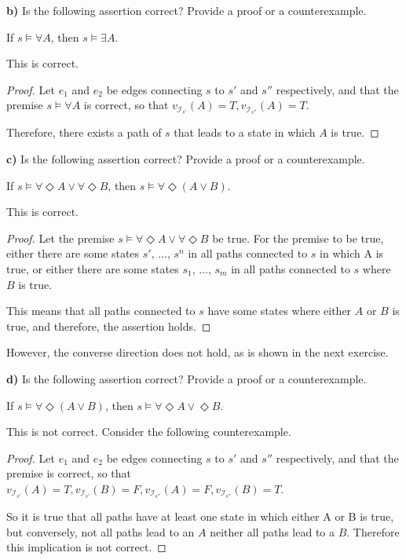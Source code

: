 \documentclass[titlepage, letterpaper, fleqn]{article}
\newcommand{\spacepls}{\vspace{5mm}}
\begin{document}
{\large \textbf{b)} Is the following assertion correct? Provide a proof or a counterexample.

If \(s \models \forall A\), then \(s \models \exists A\).}

\spacepls

This is correct.

\begin{proof}
Let \(e_1\) and \(e_2\) be edges connecting \(s\) to \(s'\) and \(s''\) respectively, and that the premise \(s \models \forall A\) is correct, so that \(v_{\mathscr{I}_{s'}}(A) = T, v_{\mathscr{I}_{s''}}(A) = T\).

Therefore, there exists a path of \(s\) that leads to a state in which \(A\) is true.
\end{proof}

\pagebreak

{\large \textbf{c)} Is the following assertion correct? Provide a proof or a counterexample.

If \(s \models \forall \Diamond A \vee \forall \Diamond B\), then \(s \models \forall \Diamond (A \vee B)\).}

\spacepls

This is correct.

\begin{proof}
Let  the premise \(s \models \forall \Diamond A \vee \forall \Diamond B\) be true. For the premise to be true, either there are some states \(s', \, \dots , \, s^n\) in all paths connected to \(s\) in which A is true, or either there are some states \(s_1, \, \dots , \, s_m\) in all paths connected to \(s\) where \(B\) is true.

This means that all paths connected to \(s\) have some states where either \(A\) or \(B\) is true, and therefore, the assertion holds.
\end{proof}

However, the converse direction does not hold, as is shown in the next exercise.

\spacepls

{\large \textbf{d)} Is the following assertion correct? Provide a proof or a counterexample.

If \(s \models \forall \Diamond(A \vee B)\), then \(s \models \forall \Diamond A \vee \Diamond B\).}

\spacepls

This is not correct. Consider the following counterexample.

\begin{proof}
Let \(e_1\) and \(e_2\) be edges connecting \(s\) to \(s'\) and \(s''\) respectively, and that the premise is correct, so that \(v_{\mathscr{I}_{s'}}(A) = T, v_{\mathscr{I}_{s'}}(B) = F, v_{\mathscr{I}_{s''}}(A) = F, v_{\mathscr{I}_{s''}}(B) = T\).

So it is true that all paths have at least one state in which either A or B is true, but conversely, not all paths lead to an \(A\) neither all paths lead to a \(B\).
Therefore this implication is not correct.
\end{proof}
\end{document}
